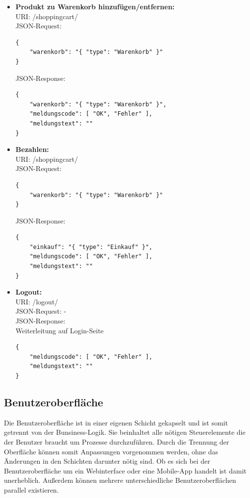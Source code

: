 \documentclass[a4paper,12pt]{article} %
\begin{document}
\begin{itemize}
	\item[] \textbf{Produkt zu Warenkorb hinzufügen/entfernen:}\\
	URI: /shoppingcart/\\
	JSON-Request:\\
	\begin{lstlisting}
{
	"warenkorb": "{ "type": "Warenkorb" }"
}
	\end{lstlisting}
	JSON-Response:\\
	\begin{lstlisting}
{
	"warenkorb": "{ "type": "Warenkorb" }",
	"meldungscode": [ "OK", "Fehler" ],
	"meldungstext": ""
}
	\end{lstlisting}
	
	\item[] \textbf{Bezahlen:}\\
	URI: /shoppingcart/\\
	JSON-Request:\\
	\begin{lstlisting}
{
	"warenkorb": "{ "type": "Warenkorb" }"
}
	\end{lstlisting}
	JSON-Response:\\
	\begin{lstlisting}
{
	"einkauf": "{ "type": "Einkauf" }",
	"meldungscode": [ "OK", "Fehler" ],
	"meldungstext": ""
}
	\end{lstlisting}
	
	\item[] \textbf{Logout:}\\
	URI: /logout/\\
	JSON-Request: -\\
	JSON-Response:\\
	Weiterleitung auf Login-Seite\\
	\begin{lstlisting}
{
	"meldungscode": [ "OK", "Fehler" ],
	"meldungstext": ""
}
	\end{lstlisting}
\end{itemize}

\subsection{Benutzeroberfläche}
Die Benutzeroberfläche ist in einer eigenen Schicht gekapselt und ist somit getrennt von der Bunsiness-Logik. Sie beinhaltet alle nötigen Steuerelemente die der Benutzer braucht um Prozesse durchzuführen. Durch die Trennung der Oberfläche können somit Anpassungen vorgenommen werden, ohne das Änderungen in den Schichten darunter nötig sind. Ob es sich bei der Benutzeroberfläche um ein Webinterface oder eine Mobile-App handelt ist damit unerheblich. Außerdem können mehrere unterschiedliche Benutzeroberflächen parallel existieren.
\end{document}
